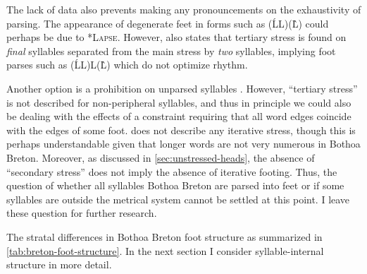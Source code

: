 The lack of data also prevents making any pronouncements on the exhaustivity of parsing. The appearance of degenerate feet in forms such as (ĹL)(L̀) could perhaps be due to *\textsc{Lapse}. However, \citet{humphreys95:_phonol_bothoa_saint_nicol_pelem} also states that tertiary stress is found on \emph{final} syllables separated from the main stress by \emph{two} syllables, implying foot parses such as (ĹL)L(L̀) which do not optimize rhythm.

Another option is a prohibition on unparsed syllables \citep[\egm][]{hayes1995}. However, \enquote{tertiary stress} is not described for non-peripheral syllables, and thus in principle we could also be dealing with the effects of a constraint requiring that all word edges coincide with the edges of some foot. \citet{humphreys95:_phonol_bothoa_saint_nicol_pelem} does not describe any iterative stress, though this is perhaps understandable given that longer words are not very numerous in Bothoa Breton. Moreover, as discussed in \cref{sec:unstressed-heads}, the absence of \enquote{secondary stress} does not imply the absence of iterative footing. Thus, the question of whether all syllables Bothoa Breton are parsed into feet or if some syllables are outside the metrical system cannot be settled at this point. I leave these question for further research.

The stratal differences in Bothoa Breton foot structure as summarized in \cref{tab:breton-foot-structure}. In the next section I consider syllable\hyp internal structure in more detail.

